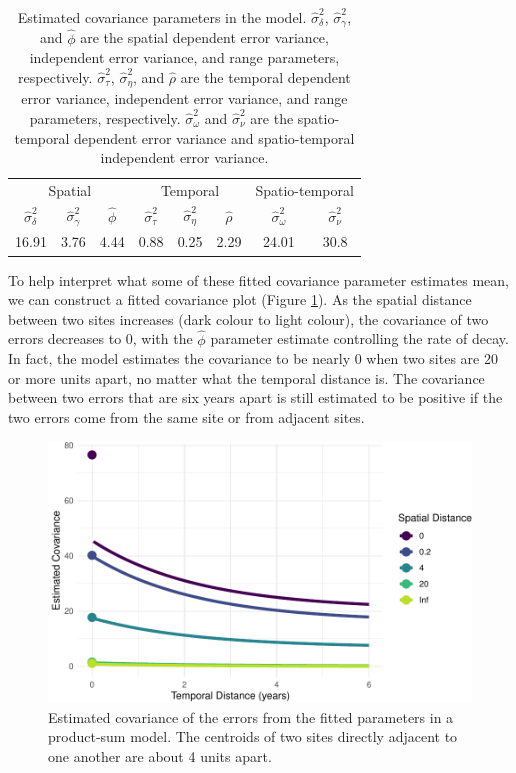 \documentclass[]{interact}
\theoremstyle{plain}%
\theoremstyle{definition}
\theoremstyle{remark}
\begin{document}
\begin{table}[H]

\caption{\label{tab:paramest}Estimated covariance parameters in the model. $\hat{\sigma}^2_{\delta}$, $\hat{\sigma}^2_{\gamma}$, and $\hat{\phi}$ are the spatial dependent error variance, independent error variance, and range parameters, respectively. $\hat{\sigma}^2_{\tau}$, $\hat{\sigma}^2_{\eta}$, and $\hat{\rho}$ are the temporal dependent error variance, independent error variance, and range parameters, respectively. $\hat{\sigma}^2_{\omega}$ and $\hat{\sigma}^2_{\nu}$ are the spatio-temporal dependent error variance and spatio-temporal independent error variance.}
\centering
\begin{tabular}[t]{cccccccc}
\toprule
\multicolumn{3}{c}{Spatial} & \multicolumn{3}{c}{Temporal} & \multicolumn{2}{c}{Spatio-temporal} \\
\cmidrule(l{3pt}r{3pt}){1-3} \cmidrule(l{3pt}r{3pt}){4-6} \cmidrule(l{3pt}r{3pt}){7-8}
$\hat{\sigma}^2_{\delta}$ & $\hat{\sigma}^2_{\gamma}$ & $\hat{\phi}$ & $\hat{\sigma}^2_{\tau}$ & $\hat{\sigma}^2_{\eta}$ & $\hat{\rho}$ & $\hat{\sigma}^2_{\omega}$ & $\hat{\sigma}^2_{\nu}$\\
\midrule
16.91 & 3.76 & 4.44 & 0.88 & 0.25 & 2.29 & 24.01 & 30.8\\
\bottomrule
\end{tabular}
\end{table}

To help interpret what some of these fitted covariance parameter
estimates mean, we can construct a fitted covariance plot (Figure
\ref{fig:covplot}). As the spatial distance between two sites increases
(dark colour to light colour), the covariance of two errors decreases to
0, with the \(\hat{\phi}\) parameter estimate controlling the rate of
decay. In fact, the model estimates the covariance to be nearly 0 when
two sites are 20 or more units apart, no matter what the temporal
distance is. The covariance between two errors that are six years apart
is still estimated to be positive if the two errors come from the same
site or from adjacent sites.

\begin{figure}
\centering
\includegraphics{fpspatiotemp_manu_files/figure-latex/covplot-1.pdf}
\caption{\label{fig:covplot} Estimated covariance of the errors from the
fitted parameters in a product-sum model. The centroids of two sites
directly adjacent to one another are about 4 units apart.}
\end{figure}
\end{document}
